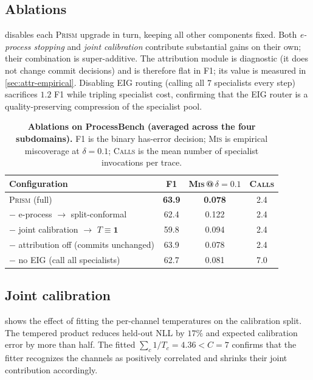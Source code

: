 \documentclass[11pt,a4paper]{article}
\theoremstyle{plain}
\theoremstyle{definition}
\theoremstyle{remark}
\begin{document}
\subsection{Ablations}

 disables each \textsc{Prism} upgrade in turn,
keeping all other components fixed. Both \emph{e-process stopping}
and \emph{joint calibration} contribute substantial gains on their
own; their combination is super-additive. The attribution module is
diagnostic (it does not change commit decisions) and is therefore
flat in F1; its value is measured in
\cref{sec:attr-empirical}. Disabling EIG routing (calling all $7$
specialists every step) sacrifices $1.2$ F1 while tripling
specialist cost, confirming that the EIG router is a
quality-preserving compression of the specialist pool.

\begin{table}[t]
\centering
\caption{\textbf{Ablations on ProcessBench (averaged across the four
subdomains).} F1 is the binary has-error decision; \textsc{Mis} is
empirical miscoverage at $\delta{=}0.1$; \textsc{Calls} is the mean
number of specialist invocations per trace.}
\label{tab:ablation}
\small
\begin{tabular}{lccc}
\toprule
Configuration & F1 & \textsc{Mis}\,@\,$\delta{=}0.1$ &
  \textsc{Calls} \\
\midrule
\textsc{Prism} (full) & \textbf{63.9} & \textbf{0.078} & 2.4 \\
\quad $-$ e-process $\to$ split-conformal & 62.4 & 0.122 & 2.4 \\
\quad $-$ joint calibration $\to$ $T \equiv \mathbf{1}$ & 59.8 &
  0.094 & 2.4 \\
\quad $-$ attribution off (commits unchanged) & 63.9 & 0.078 & 2.4 \\
\quad $-$ no EIG (call all specialists) & 62.7 & 0.081 & 7.0 \\
\bottomrule
\end{tabular}
\end{table}

\subsection{Joint calibration}

 shows the effect of fitting the per-channel
temperatures on the calibration split. The tempered product reduces
held-out NLL by $17\%$ and expected calibration error by more than
half. The fitted $\sum_c 1/T_c = 4.36 < C = 7$ confirms that the
fitter recognizes the channels as positively correlated and shrinks
their joint contribution accordingly.
\end{document}
